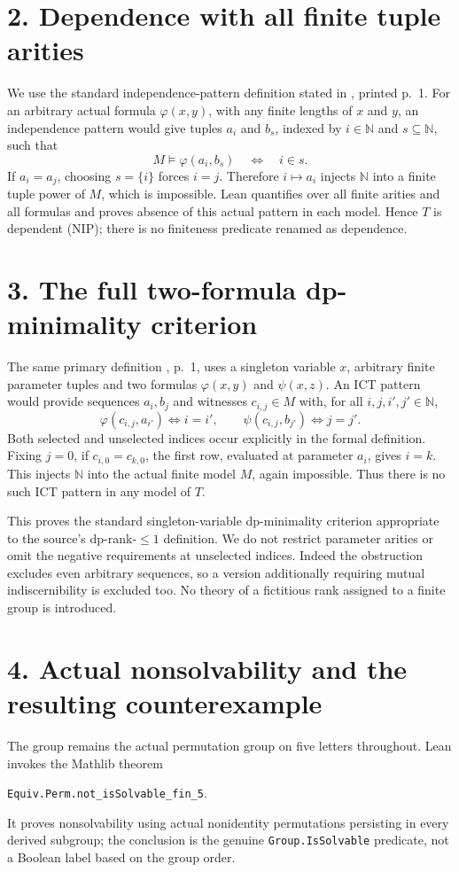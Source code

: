 \documentclass[10pt]{article}
\begin{document}
\section*{2. Dependence with all finite tuple arities}
We use the standard independence-pattern definition stated in \cite{KLS}, printed p.~1. For an arbitrary actual formula $\varphi(x,y)$, with any finite lengths of $x$ and $y$, an independence pattern would give tuples $a_i$ and $b_s$, indexed by $i\in\mathbb N$ and $s\subseteq\mathbb N$, such that
\[
 M\models\varphi(a_i,b_s)\quad\Longleftrightarrow\quad i\in s.
\]
If $a_i=a_j$, choosing $s=\{i\}$ forces $i=j$. Therefore $i\mapsto a_i$ injects $\mathbb N$ into a finite tuple power of $M$, which is impossible. Lean quantifies over all finite arities and all formulas and proves absence of this actual pattern in each model. Hence $T$ is dependent (NIP); there is no finiteness predicate renamed as dependence.

\newpage
\section*{3. The full two-formula dp-minimality criterion}
The same primary definition \cite{KLS}, p.~1, uses a singleton variable $x$, arbitrary finite parameter tuples and two formulas $\varphi(x,y)$ and $\psi(x,z)$. An ICT pattern would provide sequences $a_i,b_j$ and witnesses $c_{i,j}\in M$ with, for all $i,j,i',j'\in\mathbb N$,
\[
 \varphi(c_{i,j},a_{i'})\iff i=i',\qquad
 \psi(c_{i,j},b_{j'})\iff j=j'.
\]
Both selected and unselected indices occur explicitly in the formal definition. Fixing $j=0$, if $c_{i,0}=c_{k,0}$, the first row, evaluated at parameter $a_i$, gives $i=k$. This injects $\mathbb N$ into the actual finite model $M$, again impossible. Thus there is no such ICT pattern in any model of $T$.

This proves the standard singleton-variable dp-minimality criterion appropriate to the source's dp-rank-$\le1$ definition. We do not restrict parameter arities or omit the negative requirements at unselected indices. Indeed the obstruction excludes even arbitrary sequences, so a version additionally requiring mutual indiscernibility is excluded too. No theory of a fictitious rank assigned to a finite group is introduced.

\section*{4. Actual nonsolvability and the resulting counterexample}
The group remains the actual permutation group on five letters throughout. Lean invokes the Mathlib theorem
{\centering\texttt{Equiv.Perm.not\_isSolvable\_fin\_5}.\par}
It proves nonsolvability using actual nonidentity permutations persisting in every derived subgroup; the conclusion is the genuine \texttt{Group.IsSolvable} predicate, not a Boolean label based on the group order.
\end{document}
